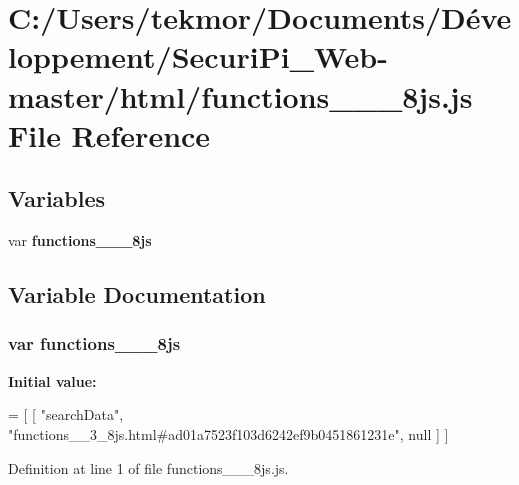 \section{C\+:/\+Users/tekmor/\+Documents/\+Développement/\+Securi\+Pi\+\_\+\+Web-\/master/html/functions\+\_\+\+\_\+\_\+8js.js File Reference}
\label{functions____3__8js_8js}
\subsection*{Variables}
\begin{DoxyCompactItemize}
\item 
var {\bf functions\+\_\+\+\_\+\_\+8js}
\end{DoxyCompactItemize}


\subsection{Variable Documentation}
\subsubsection[{functions\+\_\+\+\_\+3\+\_\+8js}]{\setlength{\rightskip}{0pt plus 5cm}var functions\+\_\+\+\_\+\_\+8js}\label{functions____3__8js_8js_a58744a4b3089105d4d5e145098102f41}
{\bfseries Initial value\+:}
\begin{DoxyCode}
=
[
    [ \textcolor{stringliteral}{"searchData"}, \textcolor{stringliteral}{"functions\_\_3\_8js.html#ad01a7523f103d6242ef9b0451861231e"}, null ]
]
\end{DoxyCode}


Definition at line 1 of file functions\+\_\+\+\_\+\_\+8js.\+js.

